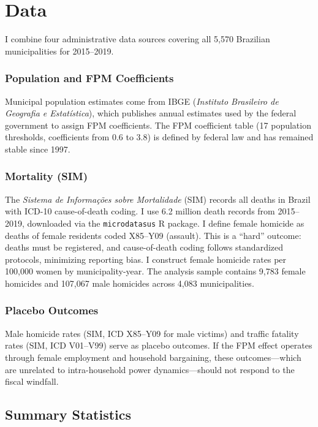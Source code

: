 \documentclass[12pt]{article}
\begin{document}
\section{Data}

I combine four administrative data sources covering all 5,570 Brazilian municipalities for 2015--2019.

\subsubsection*{Population and FPM Coefficients} Municipal population estimates come from IBGE (\textit{Instituto Brasileiro de Geografia e Estat\'{i}stica}), which publishes annual estimates used by the federal government to assign FPM coefficients. The FPM coefficient table (17 population thresholds, coefficients from 0.6 to 3.8) is defined by federal law and has remained stable since 1997.

\subsubsection*{Mortality (SIM)} The \textit{Sistema de Informa\c{c}\~{o}es sobre Mortalidade} (SIM) records all deaths in Brazil with ICD-10 cause-of-death coding. I use 6.2 million death records from 2015--2019, downloaded via the \texttt{microdatasus} R package. I define female homicide as deaths of female residents coded X85--Y09 (assault). This is a ``hard'' outcome: deaths must be registered, and cause-of-death coding follows standardized protocols, minimizing reporting bias. I construct female homicide rates per 100,000 women by municipality-year. The analysis sample contains 9,783 female homicides and 107,067 male homicides across 4,083 municipalities.

\subsubsection*{Placebo Outcomes} Male homicide rates (SIM, ICD X85--Y09 for male victims) and traffic fatality rates (SIM, ICD V01--V99) serve as placebo outcomes. If the FPM effect operates through female employment and household bargaining, these outcomes---which are unrelated to intra-household power dynamics---should not respond to the fiscal windfall.

\subsection{Summary Statistics}
\end{document}

